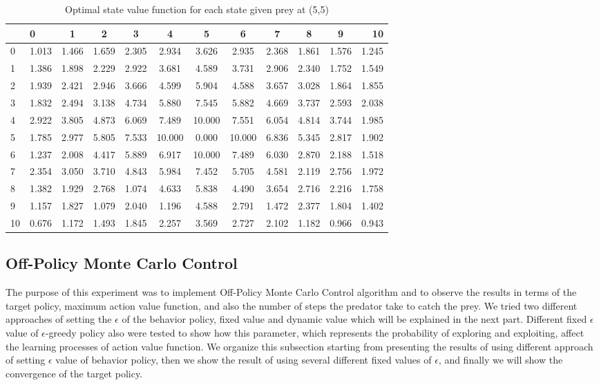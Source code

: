 \documentclass[paper=a4, fontsize=11pt]{scrartcl}
\numberwithin{equation}{section}		%
\numberwithin{figure}{section}			%
\numberwithin{table}{section}				%
\begin{document}
\begin{table}[H]
\caption{Optimal state value function for each state given prey at (5,5)}
\centering
\begin{tabular}{l|l*{9}{c}r}
  \hline
 & 0 & 1 & 2 & 3 & 4 & 5 & 6 & 7 & 8 & 9 & 10 \\ \hline 
0&1.013 & 1.466 & 1.659 & 2.305 & 2.934 & 3.626 & 2.935 & 2.368 & 1.861 & 1.576 & 1.245 \\
1&1.386 & 1.898 & 2.229 & 2.922 & 3.681 & 4.589 & 3.731 & 2.906 & 2.340 & 1.752 & 1.549 \\
2&1.939 & 2.421 & 2.946 & 3.666 & 4.599 & 5.904 & 4.588 & 3.657 & 3.028 & 1.864 & 1.855 \\
3&1.832 & 2.494 & 3.138 & 4.734 & 5.880 & 7.545 & 5.882 & 4.669 & 3.737 & 2.593 & 2.038 \\
4&2.922 & 3.805 & 4.873 & 6.069 & 7.489 & 10.000 & 7.551 & 6.054 & 4.814 & 3.744 & 1.985\\ 
5&1.785 & 2.977 & 5.805 & 7.533 & 10.000 & 0.000 & 10.000 & 6.836 & 5.345 & 2.817 & 1.902 \\ 
6&1.237 & 2.008 & 4.417 & 5.889 & 6.917 & 10.000 & 7.489 & 6.030 & 2.870 & 2.188 & 1.518 \\
7&2.354 & 3.050 & 3.710 & 4.843 & 5.984 & 7.452 & 5.705 & 4.581 & 2.119 & 2.756 & 1.972 \\
8&1.382 & 1.929 & 2.768 & 1.074 & 4.633 & 5.838 & 4.490 & 3.654 & 2.716 & 2.216 & 1.758 \\
9&1.157 & 1.827 & 1.079 & 2.040 & 1.196 & 4.588 & 2.791 & 1.472 & 2.377 & 1.804 & 1.402 \\
10&0.676 & 1.172 & 1.493 & 1.845 & 2.257 & 3.569 & 2.727 & 2.102 & 1.182 & 0.966 & 0.943 
\end{tabular}
\label{table:valueFunctionOn}
\end{table}

\subsection{Off-Policy Monte Carlo Control}
The purpose of this experiment was to implement Off-Policy Monte Carlo Control algorithm and to observe the results in terms of the target policy, maximum action value function, and also the number of steps the predator take to catch the prey. We tried two different approaches of setting the $\epsilon$ of the behavior policy, fixed value and dynamic value which will be explained in the next part. Different fixed $\epsilon$ value of $\epsilon$-greedy policy also were tested to show how this parameter, which represents the probability of exploring and exploiting, affect the learning processes of action value function. We organize this subsection starting from presenting the results of using different approach of setting $\epsilon$ value of behavior policy, then we show the result of using several different fixed values of $\epsilon$, and finally we will show the convergence of the target policy. 
\end{document}
